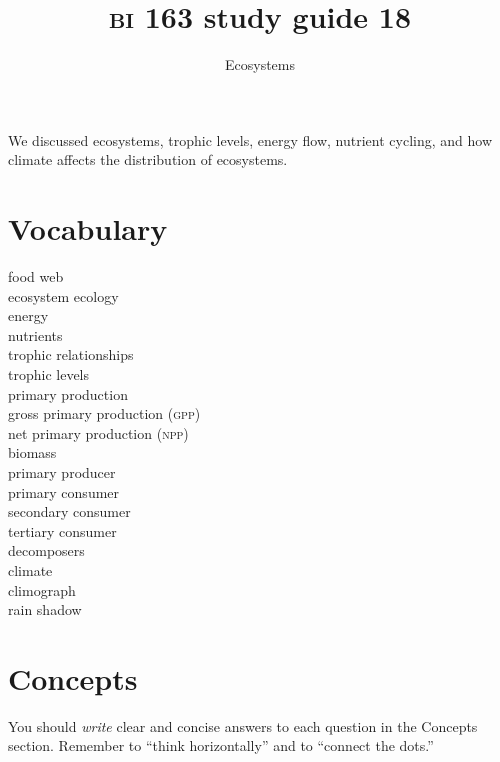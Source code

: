 \documentclass[letterpaper]{tufte-handout}
\title{{\scshape bi} 163 study guide 18}
\author{Ecosystems}
\date{} %
\begin{document}
\maketitle	%

We discussed ecosystems, trophic levels, energy flow, nutrient cycling, and how climate affects the distribution of ecosystems.

\section*{Vocabulary}

\vspace{-1\baselineskip}
\begin{multicols}{2}
food web\\
ecosystem ecology\\
energy \\
nutrients \\
trophic relationships\\
trophic levels\\
primary production\\
gross primary production (\textsc{gpp})\\
net primary production (\textsc{npp})\\
biomass\\
primary producer\\
primary consumer\\
secondary consumer\\
tertiary consumer\\
decomposers\\
climate \\
climograph \\
rain shadow
\end{multicols}

\section*{Concepts}

You should \emph{write} clear and concise answers to each question in the Concepts section.  Remember to ``think horizontally'' and to ``connect the dots.'' 
\end{document}
